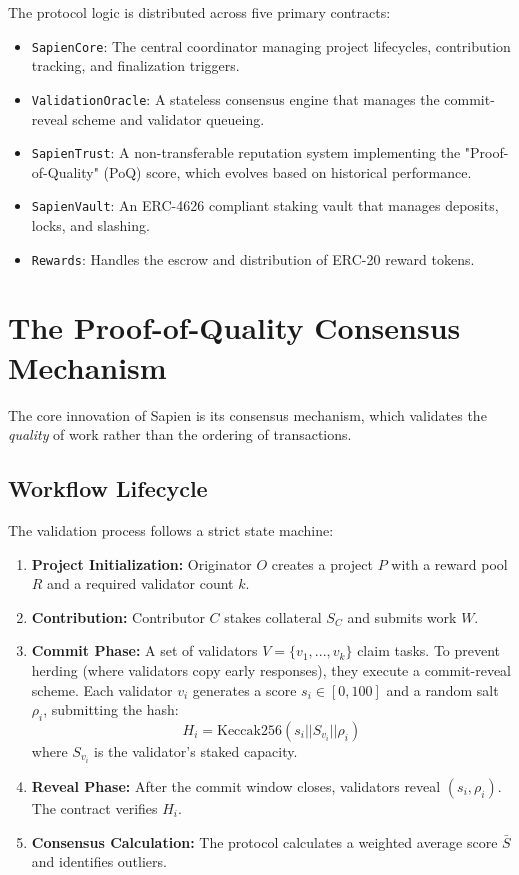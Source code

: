 \documentclass[11pt, a4paper]{article}
\begin{document}
The protocol logic is distributed across five primary contracts:
\begin{itemize}
    \item \texttt{SapienCore}: The central coordinator managing project lifecycles, contribution tracking, and finalization triggers.
    \item \texttt{ValidationOracle}: A stateless consensus engine that manages the commit-reveal scheme and validator queueing.
    \item \texttt{SapienTrust}: A non-transferable reputation system implementing the "Proof-of-Quality" (PoQ) score, which evolves based on historical performance.
    \item \texttt{SapienVault}: An ERC-4626 compliant staking vault that manages deposits, locks, and slashing.
    \item \texttt{Rewards}: Handles the escrow and distribution of ERC-20 reward tokens.
\end{itemize}

\section{The Proof-of-Quality Consensus Mechanism}

The core innovation of Sapien is its consensus mechanism, which validates the \textit{quality} of work rather than the ordering of transactions.

\subsection{Workflow Lifecycle}

The validation process follows a strict state machine:
\begin{enumerate}
    \item \textbf{Project Initialization:} Originator $O$ creates a project $P$ with a reward pool $R$ and a required validator count $k$.
    \item \textbf{Contribution:} Contributor $C$ stakes collateral $S_C$ and submits work $W$.
    \item \textbf{Commit Phase:} A set of validators $V = \{v_1, ..., v_k\}$ claim tasks. To prevent herding (where validators copy early responses), they execute a commit-reveal scheme. Each validator $v_i$ generates a score $s_i \in [0, 100]$ and a random salt $\rho_i$, submitting the hash:
    \begin{equation}
        H_i = \text{Keccak256}(s_i || S_{v_i} || \rho_i)
    \end{equation}
    where $S_{v_i}$ is the validator's staked capacity.
    \item \textbf{Reveal Phase:} After the commit window closes, validators reveal $(s_i, \rho_i)$. The contract verifies $H_i$.
    \item \textbf{Consensus Calculation:} The protocol calculates a weighted average score $\bar{S}$ and identifies outliers.
\end{enumerate}
\end{document}
